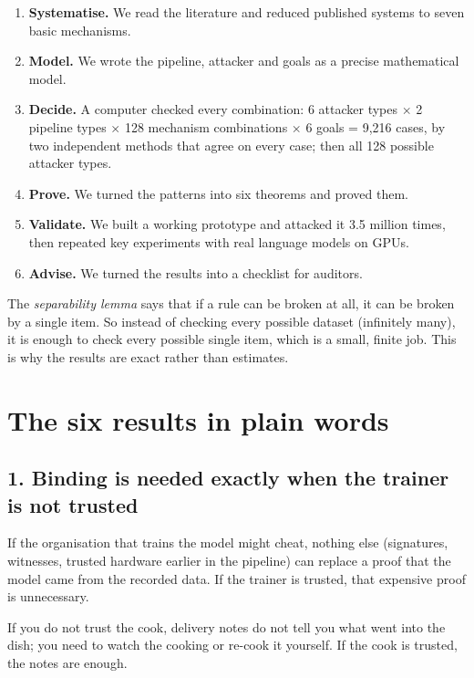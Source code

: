 \begin{enumerate}
\item \textbf{Systematise.} We read the literature and reduced published systems to seven basic
  mechanisms.
\item \textbf{Model.} We wrote the pipeline, attacker and goals as a precise mathematical model.
\item \textbf{Decide.} A computer checked every combination: 6 attacker types $\times$ 2 pipeline
  types $\times$ 128 mechanism combinations $\times$ 6 goals = 9,216 cases, by two independent
  methods that agree on every case; then all 128 possible attacker types.
\item \textbf{Prove.} We turned the patterns into six theorems and proved them.
\item \textbf{Validate.} We built a working prototype and attacked it 3.5 million times, then
  repeated key experiments with real language models on GPUs.
\item \textbf{Advise.} We turned the results into a checklist for auditors.
\end{enumerate}

\begin{analogy}
The \emph{separability lemma} says that if a rule can be broken at all, it can be broken by a
single item. So instead of checking every possible dataset (infinitely many), it is enough to
check every possible single item, which is a small, finite job. This is why the results are
exact rather than estimates.
\end{analogy}

\section{The six results in plain words}

\subsection*{1. Binding is needed exactly when the trainer is not trusted}
If the organisation that trains the model might cheat, nothing else (signatures, witnesses,
trusted hardware earlier in the pipeline) can replace a proof that the model came from the
recorded data. If the trainer is trusted, that expensive proof is unnecessary.
\begin{analogy}
If you do not trust the cook, delivery notes do not tell you what went into the dish; you need
to watch the cooking or re-cook it yourself. If the cook is trusted, the notes are enough.
\end{analogy}

